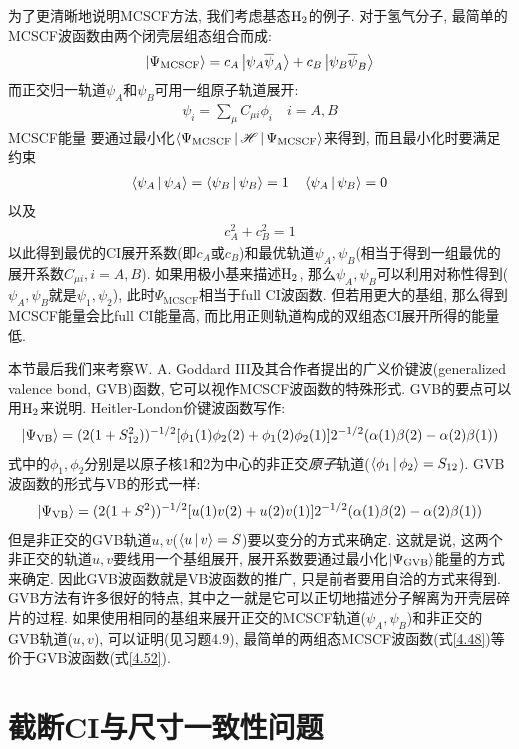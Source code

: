 为了更清晰地说明MCSCF方法, 我们考虑基态$\mathrm{H}_2$的例子. 对于氢气分子, 最简单的MCSCF波函数由两个闭壳层组态组合而成:
\begin{align}
\Ket{\Psi_\mathrm{MCSCF}} = c_A\Ket{\psi_A\overline{\psi}_A} + c_B\Ket{\psi_B\overline{\psi}_B} 
\end{align}
而正交归一轨道$\psi_A$和$\psi_B$可用一组原子轨道展开:
\begin{align}
\psi_i=\sum_\mu C_{\mu i}\phi_i\quad i=A,B
\end{align}
MCSCF能量 要通过最小化$\Braket{\Psi_\mathrm{MCSCF}|\mathscr{H}|\Psi_\mathrm{MCSCF}}$来得到, 而且最小化时要满足约束
\begin{align}
\Braket{\psi_A|\psi_A} = \Braket{\psi_B|\psi_B}=1\quad \Braket{\psi_A|\psi_B}=0
\end{align}
以及
\begin{align}
c_A^2 + c_B^2 = 1
\end{align}
以此得到最优的CI展开系数(即$c_A$或$c_B$)和最优轨道$\psi_A,\psi_B$(相当于得到一组最优的展开系数$C_{\mu i}, i=A,B$). 如果用极小基来描述$\mathrm{H}_2$, 那么$\psi_A,\psi_B$可以利用对称性得到($\psi_A,\psi_B$就是$\psi_1,\psi_2$), 此时$\Psi_\mathrm{MCSCF}$相当于full CI波函数. 但若用更大的基组, 那么得到MCSCF能量会比full CI能量高, 而比用\hft 正则轨道构成的双组态CI展开所得的能量低.

本节最后我们来考察W. A. Goddard III及其合作者提出的广义价键波(generalized valence bond, GVB)函数, 它可以视作MCSCF波函数的特殊形式. GVB的要点可以用$\mathrm{H}_2$来说明. Heitler-London价键波函数写作:
\begin{align}
\Ket{\Psi_\mathrm{VB}} = (2(1+S_{12}^2))^{-1/2} [\phi_1(1)\phi_2(2) + \phi_1(2)\phi_2(1)]2^{-1/2}(\alpha(1)\beta(2)-\alpha(2)\beta(1))
\end{align}
式中的$\phi_1,\phi_2$分别是以原子核1和2为中心的非正交\emph{原子}轨道($\Braket{\phi_1|\phi_2}=S_{12}$). GVB波函数的形式与VB的形式一样:
\begin{align}
\Ket{\Psi_\mathrm{VB}} = (2(1+S^2))^{-1/2} [u(1)v(2) + u(2)v(1)]2^{-1/2}(\alpha(1)\beta(2)-\alpha(2)\beta(1))
\end{align}
但是非正交的GVB轨道$u,v$($\Braket{u|v}=S$)要以变分的方式来确定. 这就是说, 这两个非正交的轨道$u,v$要线用一个基组展开, 展开系数要通过最小化$\Ket{\Psi_\mathrm{GVB}}$能量的方式来确定. 因此GVB波函数就是VB波函数的推广, 只是前者要用自洽的方式来得到. GVB方法有许多很好的特点, 其中之一就是它可以正切地描述分子解离为开壳层碎片的过程. 如果使用相同的基组来展开正交的MCSCF轨道($\psi_A,\psi_B$)和非正交的GVB轨道($u,v$), 可以证明(见习题4.9), 最简单的两组态MCSCF波函数(式\eqref{4.48})等价于GVB波函数(式\eqref{4.52}).




\section{截断CI与尺寸一致性问题}

\theendnotes